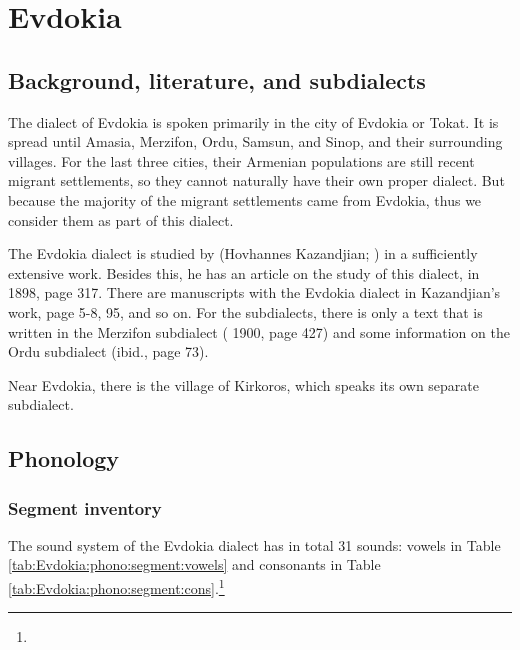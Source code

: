 \chapter{Evdokia} \label{chapter:Evdokia}
\section{Background, literature, and subdialects}

\begin{adjarianpage}\label{page:232}\end{adjarianpage}%

The dialect of Evdokia is spoken primarily in the city of Evdokia or Tokat. It is spread until Amasia, Merzifon, Ordu, Samsun, and Sinop, and their surrounding villages. For the last three cities, their Armenian populations are still recent migrant settlements, so they cannot naturally have their own proper dialect. But because the majority of the migrant settlements came from Evdokia, thus we consider them as part of this dialect. 

The Evdokia dialect is studied by \citet{KazandjianBook} (Hovhannes Kazandjian;  ) in a sufficiently extensive work. Besides this, he has an article on the study of this dialect, in  1898, page 317. There are manuscripts with the Evdokia dialect in Kazandjian's work, page 5-8, 95, and so on. For the subdialects, there is only a text that is written in the Merzifon subdialect ( 1900, page 427) and some information on the Ordu subdialect (ibid., page 73). 

Near Evdokia, there is the village of Kirkoros, which speaks its own separate subdialect. 

\section{Phonology}

\subsection{Segment inventory}

The sound system of the Evdokia dialect has in total 31 sounds: vowels in Table \ref{tab:Evdokia:phono:segment:vowels} and consonants in Table \ref{tab:Evdokia:phono:segment:cons}.\footnote{}




